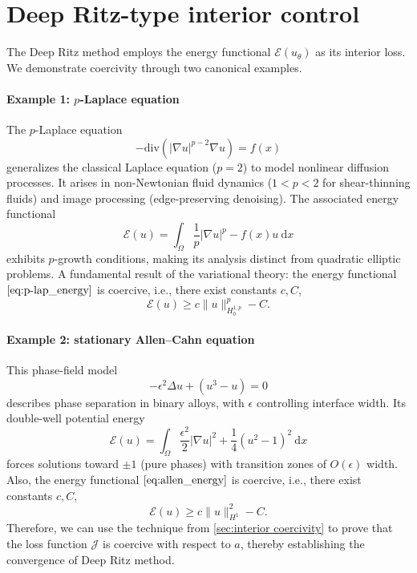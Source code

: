 \documentclass{article}
\renewcommand{\d}{\mathrm{d}}
\begin{document}
\section{Deep Ritz-type interior control}\label{sec:Deep Ritz interior}
The Deep Ritz method employs the energy functional $\mathcal{E}(u_{\theta})$ as its interior loss. We demonstrate coercivity through two canonical examples.

\paragraph{Example 1: $p$-Laplace equation}
The $p$-Laplace equation  
\begin{equation}
-\mathrm{div}(|\nabla u|^{p-2}\nabla u) = f(x)
\end{equation}
generalizes the classical Laplace equation (\(p=2\)) to model nonlinear diffusion processes. It arises in non-Newtonian fluid dynamics (\(1<p<2\) for shear-thinning fluids) and image processing (edge-preserving denoising). The associated energy functional  
\begin{equation}
\mathcal{E}(u) = \int_\Omega \frac{1}{p}|\nabla u|^p -f(x)u~\d x \label{eq:p-lap_energy}
\end{equation}
exhibits \(p\)-growth conditions, making its analysis distinct from quadratic elliptic problems.  
A fundamental result of the variational theory: the energy functional $\cref{eq:p-lap_energy}$ is coercive, i.e., there exist constants $c, C$, 
\begin{equation*}
\mathcal{E}(u)\ge c\|u\|_{H_{0}^{1,p}}^{p}-C.
\end{equation*}
\vspace{-.5em}
\paragraph{Example 2: stationary Allen--Cahn equation}
This phase-field model  
\begin{equation}
-\epsilon^2\Delta u + (u^3 - u) = 0
\end{equation}  
describes phase separation in binary alloys, with \(\epsilon\) controlling interface width. Its double-well potential energy  
\begin{equation}
\mathcal{E}(u) = \int_\Omega \frac{\epsilon^2}{2}|\nabla u|^2 + \frac{1}{4}(u^2-1)^2~\d x \label{eq:allen_energy}
\end{equation}
forces solutions toward \(\pm1\) (pure phases) with transition zones of \(O(\epsilon)\) width. 
Also, the energy functional $\cref{eq:allen_energy}$ is coercive, i.e., there exist constants $c, C$, 
\begin{equation*}
\mathcal{E}(u)\ge c\|u\|_{H^{1}}^{2}-C.
\end{equation*}
Therefore, we can use the technique from \cref{sec:interior coercivity} to prove that the loss function $\mathcal{J}$ is coercive with respect to $a$, thereby establishing the convergence of Deep Ritz method.
\end{document}

